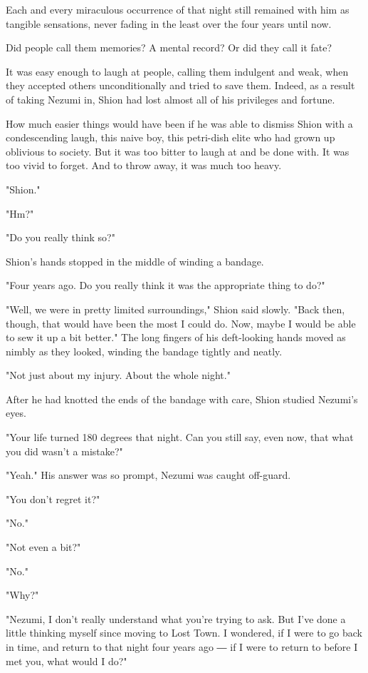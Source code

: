 Each and every miraculous occurrence of that night still remained with
him as tangible sensations, never fading in the least over the four
years until now.

Did people call them memories? A mental record? Or did they call it
fate?

It was easy enough to laugh at people, calling them indulgent and weak,
when they accepted others unconditionally and tried to save them.
Indeed, as a result of taking Nezumi in, Shion had lost almost all of
his privileges and fortune.

How much easier things would have been if he was able to dismiss Shion
with a condescending laugh, this naive boy, this petri-dish elite who
had grown up oblivious to society. But it was too bitter to laugh at and
be done with. It was too vivid to forget. And to throw away, it was much
too heavy.

"Shion."

"Hm?"

"Do you really think so?"

Shion's hands stopped in the middle of winding a bandage.

"Four years ago. Do you really think it was the appropriate thing to
do?"

"Well, we were in pretty limited surroundings," Shion said slowly. "Back
then, though, that would have been the most I could do. Now, maybe I
would be able to sew it up a bit better." The long fingers of his
deft-looking hands moved as nimbly as they looked, winding the bandage
tightly and neatly.

"Not just about my injury. About the whole night."

After he had knotted the ends of the bandage with care, Shion studied
Nezumi's eyes.

"Your life turned 180 degrees that night. Can you still say, even now,
that what you did wasn't a mistake?"

"Yeah." His answer was so prompt, Nezumi was caught off-guard.

"You don't regret it?"

"No."

"Not even a bit?"

"No."

"Why?"

"Nezumi, I don't really understand what you're trying to ask. But I've
done a little thinking myself since moving to Lost Town. I wondered, if
I were to go back in time, and return to that night four years ago ― if
I were to return to before I met you, what would I do?"

